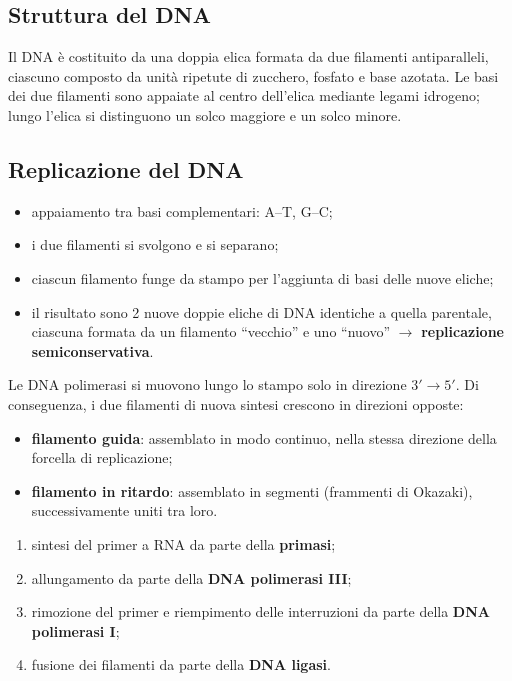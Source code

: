 \subsection{Struttura del DNA}

Il DNA è costituito da una doppia elica formata da due filamenti antiparalleli, ciascuno composto da unità ripetute di zucchero, fosfato e base azotata. Le basi dei due filamenti sono appaiate al centro dell'elica mediante legami idrogeno; lungo l'elica si distinguono un solco maggiore e un solco minore.

\subsection{Replicazione del DNA}

\begin{itemize}
  \item appaiamento tra basi complementari: A--T, G--C;
  \item i due filamenti si svolgono e si separano;
  \item ciascun filamento funge da stampo per l'aggiunta di basi delle nuove eliche;
  \item il risultato sono 2 nuove doppie eliche di DNA identiche a quella parentale, ciascuna formata da un filamento ``vecchio'' e uno ``nuovo'' $\rightarrow$ \textbf{replicazione semiconservativa}.
\end{itemize}

Le DNA polimerasi si muovono lungo lo stampo solo in direzione $3' \rightarrow 5'$. Di conseguenza, i due filamenti di nuova sintesi crescono in direzioni opposte:
\begin{itemize}
  \item \textbf{filamento guida}: assemblato in modo continuo, nella stessa direzione della forcella di replicazione;
  \item \textbf{filamento in ritardo}: assemblato in segmenti (frammenti di Okazaki), successivamente uniti tra loro.
\end{itemize}

\begin{enumerate}
  \item sintesi del primer a RNA da parte della \textbf{primasi};
  \item allungamento da parte della \textbf{DNA polimerasi III};
  \item rimozione del primer e riempimento delle interruzioni da parte della \textbf{DNA polimerasi I};
  \item fusione dei filamenti da parte della \textbf{DNA ligasi}.
\end{enumerate}

